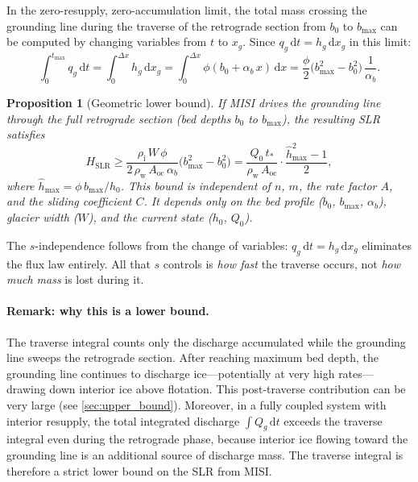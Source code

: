 \documentclass[11pt]{article}
\newtheorem{proposition}{Proposition}
\newcommand{\dd}{\mathrm{d}}
\newcommand{\Qg}{Q_g}
\newcommand{\qg}{q_g}
\newcommand{\hg}{h_g}
\newcommand{\hhat}{\hat{h}}
\newcommand{\xg}{x_g}
\newcommand{\rhoi}{\rho_{\mathrm{i}}}
\newcommand{\rhow}{\rho_{\mathrm{w}}}
\newcommand{\Aoc}{A_{\mathrm{oc}}}
\begin{document}
In the zero-resupply, zero-accumulation limit, the total mass crossing the grounding line during the traverse of the retrograde section from $b_0$ to $b_{\max}$ can be computed by changing variables from $t$ to $\xg$. Since $\qg\,\dd t = \hg\,\dd\xg$ in this limit:
\begin{equation}
	\int_0^{t_{\max}}\!\!\qg\,\dd t
	= \int_0^{\Delta x}\!\hg\,\dd\xg
	= \int_0^{\Delta x}\!\phi(b_0 + \alpha_b\,x)\,\dd x
	= \frac{\phi}{2}\bigl(b_{\max}^2 - b_0^2\bigr)\,\frac{1}{\alpha_b}.
	\label{eq:traverse_integral}
\end{equation}

\begin{proposition}[Geometric lower bound]
\label{prop:lower_bound}
If MISI drives the grounding line through the full retrograde section (bed depths $b_0$ to $b_{\max}$), the resulting SLR satisfies
\begin{equation}
	\boxed{H_{\mathrm{SLR}} \geq \frac{\rhoi\,W\,\phi}{2\,\rhow\,\Aoc\,\alpha_b}\bigl(b_{\max}^2 - b_0^2\bigr) = \frac{Q_0\,t_*}{\rhow\,\Aoc}\cdot\frac{\hhat_{\max}^2 - 1}{2},}
	\label{eq:lower_bound}
\end{equation}
where $\hhat_{\max} = \phi\,b_{\max}/h_0$. This bound is independent of $n$, $m$, the rate factor $A$, and the sliding coefficient $C$. It depends only on the bed profile ($b_0$, $b_{\max}$, $\alpha_b$), glacier width ($W$), and the current state ($h_0$, $Q_0$).
\end{proposition}

\noindent The $s$-independence follows from the change of variables: $\qg\,\dd t = \hg\,\dd\xg$ eliminates the flux law entirely. All that $s$ controls is \emph{how fast} the traverse occurs, not \emph{how much mass} is lost during it.

\paragraph{Remark: why this is a lower bound.} The traverse integral counts only the discharge accumulated while the grounding line sweeps the retrograde section. After reaching maximum bed depth, the grounding line continues to discharge ice---potentially at very high rates---drawing down interior ice above flotation. This post-traverse contribution can be very large (see \cref{sec:upper_bound}). Moreover, in a fully coupled system with interior resupply, the total integrated discharge $\int \Qg\,\dd t$ exceeds the traverse integral even during the retrograde phase, because interior ice flowing toward the grounding line is an additional source of discharge mass. The traverse integral is therefore a strict lower bound on the SLR from MISI.
\end{document}

